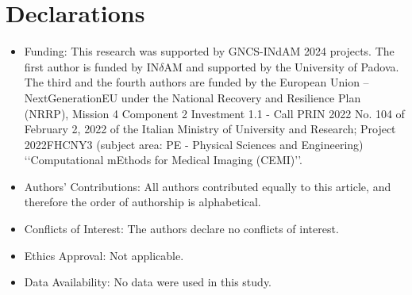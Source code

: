 \documentclass{svjour3}
\begin{document}



\section*{Declarations}

\vspace{-0.2cm}

\begin{itemize}
    \item Funding: This research was supported by GNCS-INdAM 2024 projects. The first author is funded by IN$\delta$AM and supported by the University of Padova. The third and the fourth authors are funded by the European Union – NextGenerationEU under the National Recovery and Resilience Plan (NRRP), Mission 4 Component 2 Investment 1.1 - Call PRIN 2022 No. 104 of February 2, 2022 of the Italian Ministry of University and Research; Project 2022FHCNY3 (subject area: PE - Physical Sciences and Engineering) \lq\lq Computational mEthods for Medical Imaging (CEMI)\rq\rq. 
    \item Authors' Contributions: All authors contributed equally to this article, and therefore the order of authorship is alphabetical.
    \item Conflicts of Interest: The authors declare no conflicts of interest.
    \item Ethics Approval: Not applicable.
    \item Data Availability: No data were used in this study.
\end{itemize}

\vspace{-0.6cm}
\end{document}
